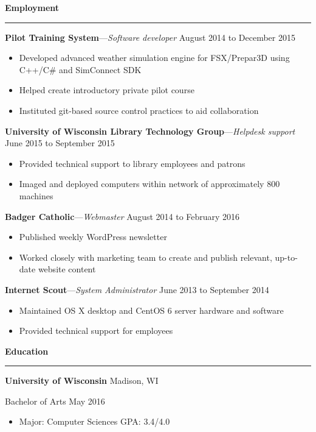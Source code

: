 \documentclass[12pt,letterpaper]{article}
\newenvironment{details}{
    \vspace{-.8em}
    \begin{itemize}
        \renewcommand \labelitemi{\labelitemiv}
        \setlength{\itemsep}{0pt}
        \setlength{\parskip}{-1pt}
        \setlength{\parsep}{0pt}
    }{
    \end{itemize}
    \vspace{-.5em}
}
\newcommand{\hr} {
    \vspace{-1em}
    \par\rule{\textwidth}{1pt}
    \vspace{-1.5em}
}
\newcommand{\ressection}[1] {
    \par{\large \textbf{#1}}
    \hr
}
\newenvironment{employment} {
    \setlength{\parskip}{0pt}
    \ressection{Employment}
}{
    \vspace{0.5em}
}
\newenvironment{education} {
    \ressection{Education}
}{
    \vspace{0.5em}
}
\newcommand{\employer}[3] {
    \vspace{3pt}
    {\par\textbf{#1}---\textit{#2} \hfill #3}
    \vspace{3pt}
    \par
}
\newcommand{\educator}[4] {
    \textbf{#1}
    \hfill #2
    \par #3 \hfill #4
    \par%
    \vspace{3pt}
}
\begin{document}
\begin{employment}
\employer{Pilot Training System}{Software developer}{August 2014 to December 2015}
\begin{details}
    \item Developed advanced weather simulation engine for FSX/Prepar3D using C++/C\# and SimConnect SDK
    \item Helped create introductory private pilot course
    \item Instituted git-based source control practices to aid collaboration
\end{details}

\employer{University of Wisconsin Library Technology Group}{Helpdesk support}{June 2015 to September 2015}
\begin{details}
    \item Provided technical support to library employees and patrons
    \item Imaged and deployed computers within network of approximately 800 machines
\end{details}

\employer{Badger Catholic}{Webmaster}{August 2014 to February 2016}
\begin{details}
    \item Published weekly WordPress newsletter
    \item Worked closely with marketing team to create and publish relevant, up-to-date website content
\end{details}

\employer{Internet Scout}{System Administrator}{June 2013 to September 2014}
\begin{details}
    \item Maintained OS X desktop and CentOS 6 server hardware and software
    \item Provided technical support for employees
\end{details}

\end{employment}

\begin{education}

\educator{University of Wisconsin}{Madison, WI}{Bachelor of Arts}{May 2016}
\begin{details}
    \item Major: Computer Sciences \hfill GPA: 3.4/4.0
\end{details}

\end{education}
\end{document}
